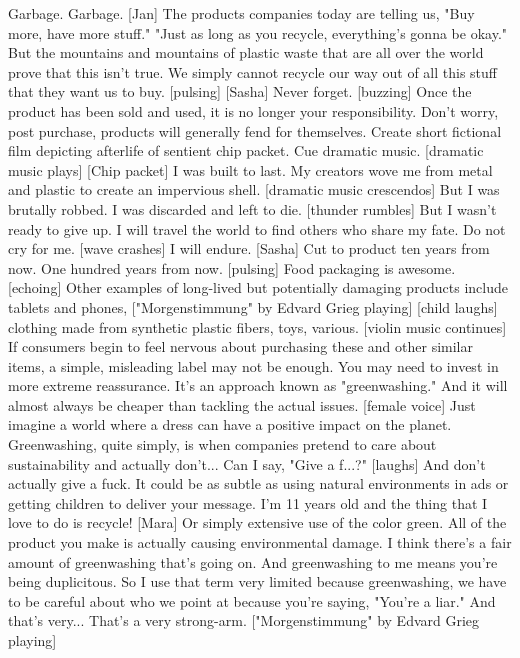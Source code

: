 \documentclass[a4paper]{article}
\begin{document}
	Garbage.
	Garbage.
	[Jan] The products companies today are telling us,
	"Buy more, have more stuff."
	"Just as long as you recycle, everything's gonna be okay."
	But the mountains and mountains of plastic waste
	that are all over the world prove that this isn't true.
	We simply cannot recycle our way
	out of all this stuff that they want us to buy.
	[pulsing]
	[Sasha] Never forget.
	[buzzing]
	Once the product has been sold and used, it is no longer your responsibility.
	Don't worry,
	post purchase, products will generally fend for themselves.
	Create short fictional film depicting afterlife of sentient chip packet.
	Cue dramatic music.
	[dramatic music plays]
	[Chip packet] I was built to last.
	My creators wove me from metal and plastic
	to create an impervious shell.
	[dramatic music crescendos]
	But I was brutally robbed.
	I was discarded and left to die.
	[thunder rumbles]
	But I wasn't ready to give up.
	I will travel the world
	to find others who share my fate.
	Do not cry for me.
	[wave crashes]
	I will endure.
	[Sasha] Cut to product ten years from now.
	One hundred years from now.
	[pulsing]
	Food packaging is awesome. [echoing]
	Other examples of long-lived but potentially damaging products include
	tablets and phones,
	["Morgenstimmung" by Edvard Grieg playing]
	[child laughs]
	clothing made from synthetic plastic fibers,
	toys, various.
	[violin music continues]
	If consumers begin to feel nervous
	about purchasing these and other similar items,
	a simple, misleading label may not be enough.
	You may need to invest in more extreme reassurance.
	It's an approach known as "greenwashing."
	And it will almost always be cheaper than tackling the actual issues.
	[female voice] Just imagine a world where a dress
	can have a positive impact on the planet.
	Greenwashing, quite simply, is when companies pretend to care about
	sustainability and actually don't... Can I say, "Give a f...?"
	[laughs]
	And don't actually give a fuck.
	It could be as subtle as using natural environments in ads
	or getting children to deliver your message.
	I'm 11 years old and the thing that I love to do is recycle!
	[Mara] Or simply extensive use of the color green.
	All of the product you make is actually causing environmental damage.
	I think there's a fair amount of greenwashing that's going on.
	And greenwashing to me means you're being duplicitous.
	So I use that term very limited
	because greenwashing, we have to be careful about who we point at
	because you're saying, "You're a liar."
	And that's very... That's a very strong-arm.
	["Morgenstimmung" by Edvard Grieg playing]
\end{document}
